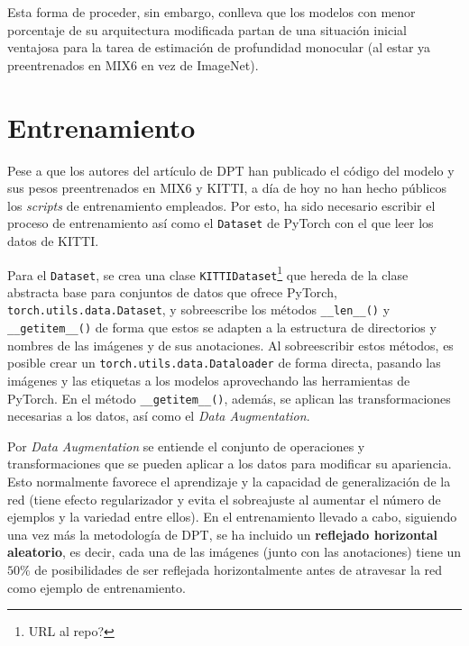 Esta forma de proceder, sin embargo, conlleva que los modelos con menor porcentaje de su arquitectura modificada partan de una situación inicial ventajosa para la tarea de estimación de profundidad monocular (al estar ya preentrenados en MIX6 en vez de ImageNet).

\section{Entrenamiento}
Pese a que los autores del artículo de DPT \cite{visiontransformersDPT} han publicado el código del modelo y sus pesos preentrenados en MIX6 y KITTI, a día de hoy no han hecho públicos los \textit{scripts} de entrenamiento empleados. Por esto, ha sido necesario escribir el proceso de entrenamiento así como el \texttt{Dataset} de PyTorch con el que leer los datos de KITTI.

Para el \texttt{Dataset}, se crea una clase \texttt{KITTIDataset}\footnote{URL al repo?} que hereda de la clase abstracta base para conjuntos de datos que ofrece PyTorch, \texttt{torch.utils.data.Dataset}, y sobreescribe los métodos \texttt{\_\_len\_\_()} y \texttt{\_\_getitem\_\_()} de forma que estos se adapten a la estructura de directorios y nombres de las imágenes y de sus anotaciones. Al sobreescribir estos métodos, es posible crear un \texttt{torch.utils.data.Dataloader} de forma directa, pasando las imágenes y las etiquetas a los modelos aprovechando las herramientas de PyTorch. En el método \texttt{\_\_getitem\_\_()}, además, se aplican las transformaciones necesarias a los datos, así como el \textit{Data Augmentation}.

Por \textit{Data Augmentation} se entiende el conjunto de operaciones y transformaciones que se pueden aplicar a los datos para modificar su apariencia. Esto normalmente favorece el aprendizaje y la capacidad de generalización de la red (tiene efecto regularizador y evita el sobreajuste al aumentar el número de ejemplos y la variedad entre ellos). En el entrenamiento llevado a cabo, siguiendo una vez más la metodología de DPT, se ha incluido un \textbf{reflejado horizontal aleatorio}, es decir, cada una de las imágenes (junto con las anotaciones) tiene un $50\%$ de posibilidades de ser reflejada horizontalmente antes de atravesar la red como ejemplo de entrenamiento.

